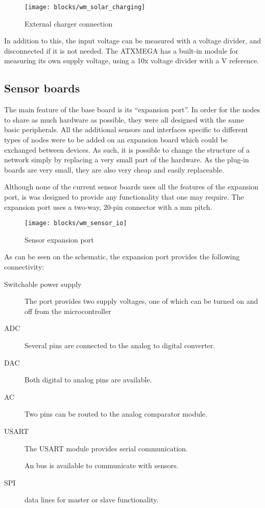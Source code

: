 \begin{figure}[h]
  \begin{center}
    \texttt{[image: blocks/wm\_solar\_charging]}
  \end{center}
  \caption{External charger connection}
  \label{fig:solar-charger}
\end{figure}

In addition to this, the input voltage can be measured with a voltage divider,
and disconnected if it is not needed. The ATXMEGA has a built-in module for
measuring its own supply voltage, using a 10x voltage divider with a \unit[1]{V}
reference.

\subsection{Sensor boards}

The main feature of the base board is its ``expansion port''. In order for the
nodes to share as much hardware as possible, they were all designed with the
same basic peripherals. All the additional sensors and interfaces specific to
different types of nodes were to be added on an expansion board which could be
exchanged between devices. As such, it is possible to change the structure of a
network simply by replacing a very small part of the hardware. As the plug-in
boards are very small, they are also very cheap and easily replaceable.

Although none of the current sensor boards uses all the features of the
expansion port, is was designed to provide any functionality that one may
require. The expansion port uses a two-way, 20-pin connector with a \unit[2]{mm}
pitch.

\begin{figure}[!h]
  \begin{center}
    \texttt{[image: blocks/wm\_sensor\_io]}
  \end{center}
  \caption{Sensor expansion port}
  \label{fig:sensor-io}
\end{figure}

As can be seen on the schematic, the expansion port provides the following
connectivity:
\begin{description}
  \item [Switchable power supply] The port provides two supply voltages, one of
    which can be turned on and off from the microcontroller
  \item[ADC] Several pins are connected to the analog to digital converter.
  \item[DAC] Both digital to analog pins are available.
  \item[AC] Two pins can be routed to the analog comparator module.
  \item[USART] The USART module provides serial communication.
  \item[\IIC{}] An \IIC{} bus is available to communicate with sensors.
  \item[SPI] data lines for master or slave functionality.
\end{description}

